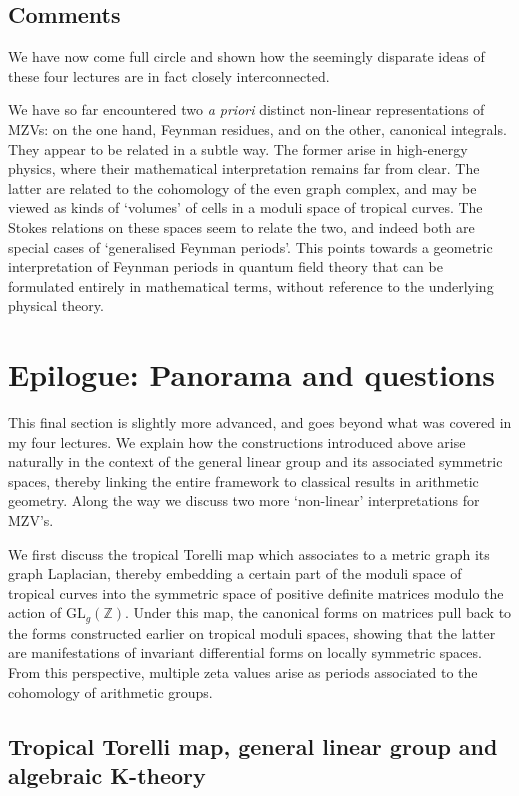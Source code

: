 \documentclass[12pt]{amsart}
\newcommand{\ZZ}{{\mathbb Z}}
\theoremstyle{plain}
\newcommand{\0}{\color{blue}{\mathsf{0}}}
\begin{document}
 \subsection{Comments}
 We have now come full circle and shown how   the seemingly disparate ideas of these four lectures are in fact  closely interconnected. 

We have so far encountered two \emph{a priori} distinct  non-linear representations  of MZVs: on the one hand, Feynman residues, and on the other,  canonical integrals. They appear  to be related in a subtle way.
The  former arise in high-energy physics, where their mathematical interpretation remains far from clear. The latter are related to the cohomology of the even graph complex, and may be viewed as kinds of `volumes' of cells in a moduli space of tropical curves. The Stokes relations on these spaces  seem to relate the two, and indeed  both are  special cases of `generalised Feynman periods'.   
This points towards a geometric interpretation of Feynman periods in quantum field theory that can be formulated entirely in mathematical terms, without reference to the underlying physical theory.


 
\section{Epilogue: Panorama and questions}

This final section is slightly more advanced, and goes beyond what was covered in my four lectures.
We explain how the constructions introduced above arise naturally in the context of the general linear group and its associated symmetric spaces, thereby linking the entire framework to classical results in arithmetic geometry. Along the way we discuss two more  `non-linear' interpretations for MZV's.



We first discuss the tropical Torelli map  which associates to a metric graph its graph Laplacian, thereby embedding a certain part of  the moduli space of tropical curves into the symmetric space of positive definite matrices modulo the action of $\mathrm{GL}_g(\ZZ)$. 
Under this map, the canonical forms on matrices pull back to the forms constructed earlier on tropical moduli spaces, showing that the latter are manifestations of invariant differential forms on locally symmetric spaces.
From this perspective,  multiple zeta values arise as periods associated to the cohomology of arithmetic groups.
\subsection{Tropical Torelli map, general linear group and algebraic K-theory}
\end{document}
